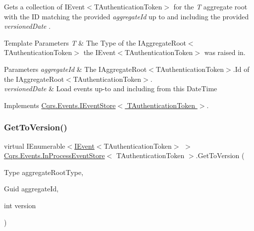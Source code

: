Gets a collection of I\+Event$<$\+T\+Authentication\+Token$>$ for the {\itshape T} aggregate root with the ID matching the provided {\itshape aggregate\+Id}  up to and including the provided {\itshape versioned\+Date} . 


\begin{DoxyTemplParams}{Template Parameters}
{\em T} & The Type of the I\+Aggregate\+Root$<$\+T\+Authentication\+Token$>$ the I\+Event$<$\+T\+Authentication\+Token$>$ was raised in.\\
\hline
\end{DoxyTemplParams}

\begin{DoxyParams}{Parameters}
{\em aggregate\+Id} & The I\+Aggregate\+Root$<$\+T\+Authentication\+Token$>$.\+Id of the I\+Aggregate\+Root$<$\+T\+Authentication\+Token$>$.\\
\hline
{\em versioned\+Date} & Load events up-\/to and including from this Date\+Time\\
\hline
\end{DoxyParams}


Implements \hyperlink{interfaceCqrs_1_1Events_1_1IEventStore_ae0d3304dcab1e6c94eb51b3a0eb645cd_ae0d3304dcab1e6c94eb51b3a0eb645cd}{Cqrs.\+Events.\+I\+Event\+Store$<$ T\+Authentication\+Token $>$}.

\mbox{\label{classCqrs_1_1Events_1_1InProcessEventStore_a88c16e2e7051094a5444a566f69119e7_a88c16e2e7051094a5444a566f69119e7}} 
\subsubsection{\texorpdfstring{Get\+To\+Version()}{GetToVersion()}}
{\footnotesize\ttfamily virtual I\+Enumerable$<$\hyperlink{interfaceCqrs_1_1Events_1_1IEvent}{I\+Event}$<$T\+Authentication\+Token$>$ $>$ \hyperlink{classCqrs_1_1Events_1_1InProcessEventStore}{Cqrs.\+Events.\+In\+Process\+Event\+Store}$<$ T\+Authentication\+Token $>$.Get\+To\+Version (\begin{DoxyParamCaption}\item[{Type}]{aggregate\+Root\+Type,  }\item[{Guid}]{aggregate\+Id,  }\item[{int}]{version }\end{DoxyParamCaption})\hspace{0.3cm}{\ttfamily [virtual]}}



